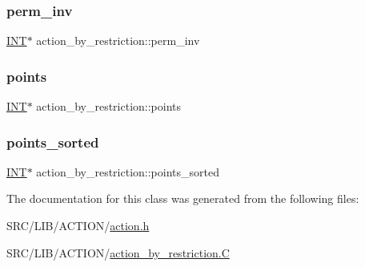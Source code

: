 \subsubsection{\texorpdfstring{perm\+\_\+inv}{perm\_inv}}
{\footnotesize\ttfamily \mbox{\hyperlink{galois_8h_a09fddde158a3a20bd2dcadb609de11dc}{I\+NT}}$\ast$ action\+\_\+by\+\_\+restriction\+::perm\+\_\+inv}

\mbox{\label{classaction__by__restriction_a8cfd948da85957a869756e2d0555ea7c}} 
\subsubsection{\texorpdfstring{points}{points}}
{\footnotesize\ttfamily \mbox{\hyperlink{galois_8h_a09fddde158a3a20bd2dcadb609de11dc}{I\+NT}}$\ast$ action\+\_\+by\+\_\+restriction\+::points}

\mbox{\label{classaction__by__restriction_a34ba063e1c2ced2be42665dca3202c41}} 
\subsubsection{\texorpdfstring{points\+\_\+sorted}{points\_sorted}}
{\footnotesize\ttfamily \mbox{\hyperlink{galois_8h_a09fddde158a3a20bd2dcadb609de11dc}{I\+NT}}$\ast$ action\+\_\+by\+\_\+restriction\+::points\+\_\+sorted}



The documentation for this class was generated from the following files\+:\begin{DoxyCompactItemize}
\item 
S\+R\+C/\+L\+I\+B/\+A\+C\+T\+I\+O\+N/\mbox{\hyperlink{action_8h}{action.\+h}}\item 
S\+R\+C/\+L\+I\+B/\+A\+C\+T\+I\+O\+N/\mbox{\hyperlink{action__by__restriction_8_c}{action\+\_\+by\+\_\+restriction.\+C}}\end{DoxyCompactItemize}
